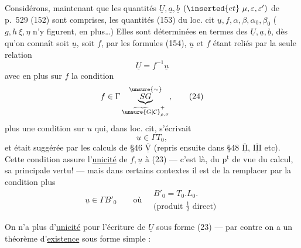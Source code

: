 Considérons, maintenant que les quantités $\underline U,\underline a,\underline b$ $(\inserted{et}\ \mu,\varepsilon,\varepsilon')$ de p.~529 (152) sont comprises, les quantités (153) du loc. cit $\underline u,f,\alpha,\beta,\alpha_0,\beta_0$ ($g,h\ \xi,\eta$ n'y figurent, en plus\ldots) Elles sont déterminées en termes des $\underline U,\underline a,\underline b$, dès qu'on connaît soit $\underline u$, soit $f$, par les formules (154), $\underline u$ et $f$ étant reliés par la seule relation
\[
\underline U=f^{-1}\underline u \tag{23}
\]
avec en plus sur $f$ la condition
\[
f\in\Gamma\underbrace{SG}_{\widetilde{\unsure{G|\mathcal C}}_{\rho,\sigma}^{+}}^{\unsure{\sim}},\tag{24}
\]
plus une condition sur $u$ qui, dans loc. cit, s'écrivait
\[
\underline u\in\Gamma T_0,\tag{25}
\]
et était suggérée par les calculs de \S46 $\overline{\underline{\mathrm V}}$ (repris ensuite dans \S48 $\overline{\underline{\mathrm{II}}}$, $\overline{\underline{\mathrm{III}}}$ etc). Cette condition assure l'\uline{unicité} de $f,\underline u$  à (23) --- c'est là, du $\mathrm p^{\mathrm t}$ de vue du calcul, sa principale vertu! --- mais dans certains contextes il est  de la remplacer par la condition plus 
\[
\underline u\in\Gamma B'_0
\qquad\text{où}\quad
\begin{gathered}
B'_0=T_0.L_0.\\
\text{(produit }\tfrac12\text{ direct)}
\end{gathered}\tag{26}
\]



On n'a plus  d'\uline{unicité} pour l'écriture de $\underline U$ sous forme (23) --- par contre on a un théorème d'\uline{existence} sous forme simple :

